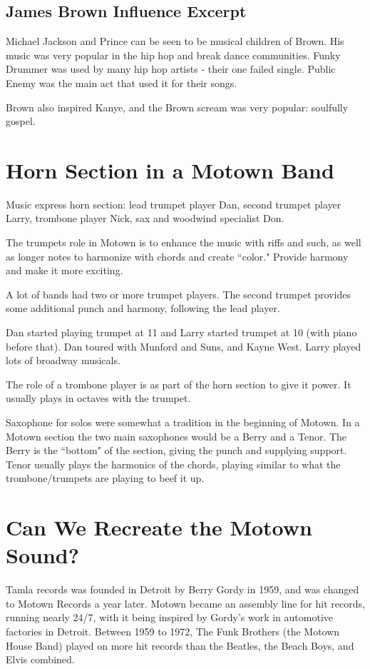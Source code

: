 \documentclass[12pt, a4paper, twoside, openright, titlepage]{book}
\begin{document}
\subsection{James Brown Influence Excerpt}


Michael Jackson and Prince can be seen to be musical children of Brown. His music was very popular in the hip hop and break dance communities. Funky Drummer was used by many hip hop artists - their one failed single. Public Enemy was the main act that used it for their songs.

Brown also inspired Kanye, and the Brown scream was very popular: soulfully gospel.




\section{Horn Section in a Motown Band}

Music express horn section: lead trumpet player Dan, second trumpet player Larry, trombone player Nick, sax and woodwind specialist Don. 

The trumpets role in Motown is to enhance the music with riffs and such, as well as longer notes to harmonize with chords and create ``color." Provide harmony and make it more exciting.

A lot of bands had two or more trumpet players. The second trumpet provides some additional punch and harmony, following the lead player.

Dan started playing trumpet at 11 and Larry started trumpet at 10 (with piano before that). Dan toured with Munford and Suns, and Kayne West. Larry played lots of broadway musicals. 


The role of a trombone player is as part of the horn section to give it power. It usually plays in octaves with the trumpet. 


Saxophone for solos were somewhat a tradition in the beginning of Motown. In a Motown section the two main saxophones would be a Berry and a Tenor. The Berry is the ``bottom" of the section, giving the punch and supplying support. Tenor usually plays the harmonics of the chords, playing similar to what the trombone/trumpets are playing to beef it up. 


\section{Can We Recreate the Motown Sound?}

Tamla records was founded in Detroit by Berry Gordy in 1959, and was changed to Motown Records a year later. Motown became an assembly line for hit records, running nearly 24/7, with it being inspired by Gordy's work in automotive factories in Detroit. Between 1959 to 1972, The Funk Brothers (the Motown House Band) played on more hit records than the Beatles, the Beach Boys, and Elvis combined.
\end{document}
